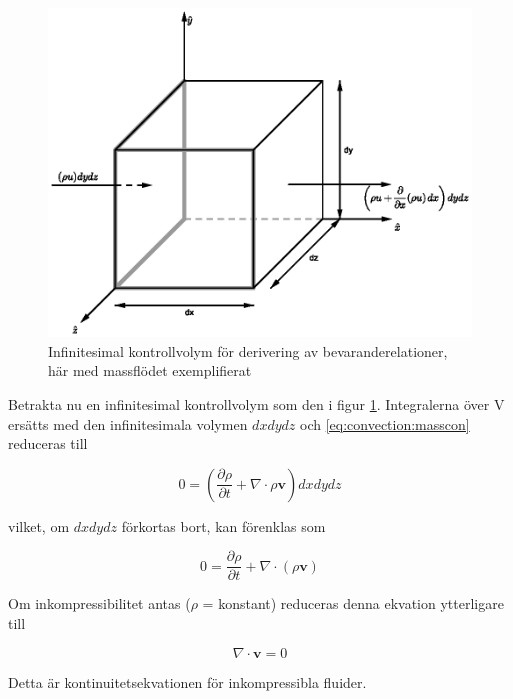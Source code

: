 \begin{figure}[hpbt]
\centering
\includegraphics[scale=1]{images/massflowcube.eps}
\caption{\label{fig:massflowcube} Infinitesimal kontrollvolym för derivering av bevaranderelationer, här med massflödet exemplifierat}
\end{figure}

Betrakta nu en infinitesimal kontrollvolym som den i figur \ref{fig:massflowcube}. Integralerna över V ersätts med den infinitesimala volymen $dxdydz$ och \eqref{eq:convection:masscon} reduceras till

\begin{equation}
\label{eq:convection:massconinf}
0 = \left( \frac{\partial \rho}{\partial t} + \nabla \cdot \rho \mathbf{v}\right) dxdydz
\end{equation}

vilket, om $dxdydz$ förkortas bort, kan förenklas som

\begin{equation}
\label{eq:convection:continuity}
0 = \frac{\partial \rho}{\partial t} + \nabla \cdot \left( \rho \mathbf{v} \right) 
\end{equation}

Om inkompressibilitet antas ($\rho$ = konstant) reduceras denna ekvation ytterligare till

\begin{equation}
\label{eq:convection:continuityinc}
\nabla \cdot \mathbf{v} = 0
\end{equation}

Detta är kontinuitetsekvationen för inkompressibla fluider.

